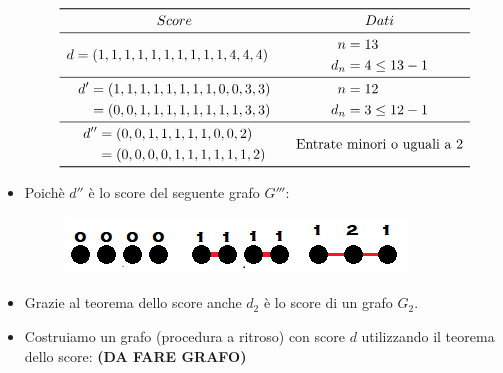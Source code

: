 \documentclass[10pt]{article}
\begin{document}
\begin{itemize}
	\[
	\begin{array}{cc}
		\toprule
		Score & Dati \\
		\midrule
		\begin{split} d &= (1,1,1,1,1,1,1,1,1,1,4,4,4) \end{split} & \begin{split} n &= 13 \\ d_n &= 4 \leq 13 -1 \end{split} \\
		\midrule
		\begin{split} d' &= (1,1,1,1,1,1,1,1,0,0,3,3) \\ &= (0,0,1,1,1,1,1,1,1,1,3,3) \end{split} & \begin{split} n &= 12 \\ d_n &= 3 \leq 12 -1 \end{split} \\
		\midrule
		\begin{split} d'' &= (0,0,1,1,1,1,1,0,0,2) \\ &= (0,0,0,0,1,1,1,1,1,1,2) \end{split} & \textrm{Entrate minori o uguali a 2} \\
		\bottomrule
	\end{array}
	\]
	\item
	Poichè $d''$ è lo score del seguente grafo $G'''$:
	\begin{center}
		\begin{figure}[h]
		\centering
		\includegraphics[width = 0.3\linewidth]{scoreGrafo_Esercizio5}
	\end{figure}
	\end{center}
	\item 
	Grazie al teorema dello score anche $d_2$ è lo score di un grafo $G_2$.
	\item
	Costruiamo un grafo (procedura a ritroso) con score $d$ utilizzando il teorema dello score: \textbf{(DA FARE GRAFO)}
	\end{itemize}
\end{document}
